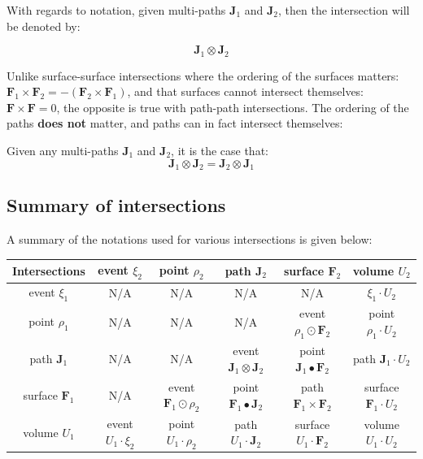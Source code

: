 With regards to notation, given multi-paths \(\mathbf{J}_1\) and \(\mathbf{J}_2\), then the intersection will be denoted by: 

\[\mathbf{J}_1 \otimes \mathbf{J}_2\]  

Unlike surface-surface intersections where the ordering of the surfaces matters: \(\mathbf{F}_1 \times \mathbf{F}_2 = -(\mathbf{F}_2 \times \mathbf{F}_1)\), and that surfaces cannot intersect themselves: \(\mathbf{F} \times \mathbf{F} = 0\), the opposite is true with path-path intersections. The ordering of the paths {\bf does not} matter, and paths can in fact intersect themselves:

\begin{thm}
Given any multi-paths \(\mathbf{J}_1\) and \(\mathbf{J}_2\), it is the case that:
\[\mathbf{J}_1 \otimes \mathbf{J}_2 = \mathbf{J}_2 \otimes \mathbf{J}_1\]
\end{thm}




\subsection{Summary of intersections}

A summary of the notations used for various intersections is given below:

\vspace{5mm}

\begin{tabular}{|c||c|c|c|c|c|}
\hline
Intersections & event \(\xi_2\) & point \(\rho_2\) & path \(\mathbf{J}_2\) & surface \(\mathbf{F}_2\) & volume \(U_2\) \\
\hline
\hline
event \(\xi_1\) & 
N/A & 
N/A & 
N/A & 
N/A & 
\(\xi_1 \cdot U_2\) \\
\hline
point \(\rho_1\) & 
N/A & 
N/A & 
N/A & 
event \(\rho_1 \odot \mathbf{F}_2\) & 
point \(\rho_1 \cdot U_2\) \\ 
\hline
path \(\mathbf{J}_1\) & 
N/A & 
N/A & 
event \(\mathbf{J}_1 \otimes \mathbf{J}_2\) & 
point \(\mathbf{J}_1 \bullet \mathbf{F}_2\) & 
path \(\mathbf{J}_1 \cdot U_2\) \\ 
\hline
surface \(\mathbf{F}_1\) & 
N/A & 
event \(\mathbf{F}_1 \odot \rho_2\) &
point \(\mathbf{F}_1 \bullet \mathbf{J}_2\) & 
path \(\mathbf{F}_1 \times \mathbf{F}_2\) & 
surface \(\mathbf{F}_1 \cdot U_2\) \\ 
\hline
volume \(U_1\) & 
event \(U_1 \cdot \xi_2\) & 
point \(U_1 \cdot \rho_2\) & 
path \(U_1 \cdot \mathbf{J}_2\) & 
surface \(U_1 \cdot \mathbf{F}_2\) & 
volume \(U_1 \cdot U_2\) \\
\hline
\end{tabular}

